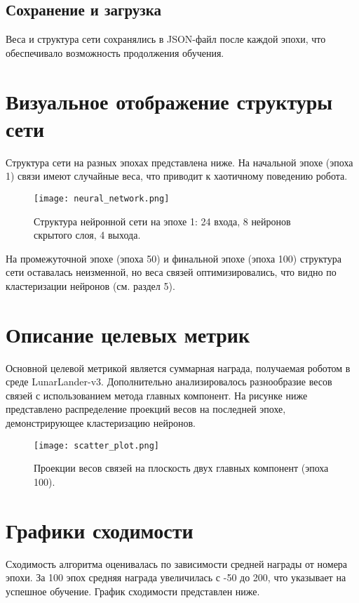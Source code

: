 \documentclass[a4paper,12pt]{article}
\begin{document}
\subsection{Сохранение и загрузка}
Веса и структура сети сохранялись в JSON-файл после каждой эпохи, что обеспечивало возможность продолжения обучения.

\section{Визуальное отображение структуры сети}
Структура сети на разных эпохах представлена ниже. На начальной эпохе (эпоха 1) связи имеют случайные веса, что приводит к хаотичному поведению робота.

\begin{figure}[H]
    \centering
    \texttt{[image: neural\_network.png]}
    \caption{Структура нейронной сети на эпохе 1: 24 входа, 8 нейронов скрытого слоя, 4 выхода.}
\end{figure}

На промежуточной эпохе (эпоха 50) и финальной эпохе (эпоха 100) структура сети оставалась неизменной, но веса связей оптимизировались, что видно по кластеризации нейронов (см. раздел 5).

\section{Описание целевых метрик}
Основной целевой метрикой является суммарная награда, получаемая роботом в среде LunarLander-v3. Дополнительно анализировалось разнообразие весов связей с использованием метода главных компонент. На рисунке ниже представлено распределение проекций весов на последней эпохе, демонстрирующее кластеризацию нейронов.

\begin{figure}[H]
    \centering
    \texttt{[image: scatter\_plot.png]}
    \caption{Проекции весов связей на плоскость двух главных компонент (эпоха 100).}
\end{figure}

\section{Графики сходимости}
Сходимость алгоритма оценивалась по зависимости средней награды от номера эпохи. За 100 эпох средняя награда увеличилась с -50 до 200, что указывает на успешное обучение. График сходимости представлен ниже.
\end{document}
